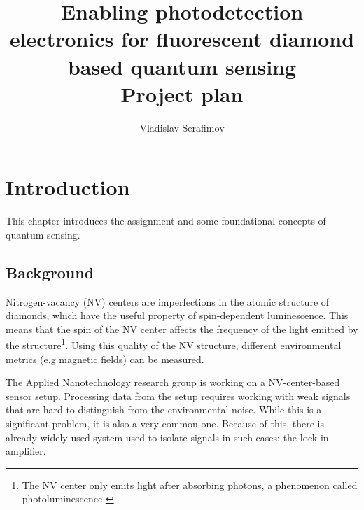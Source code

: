 \documentclass{report}
\title{Enabling photodetection electronics for 
	fluorescent diamond based quantum sensing \\Project plan}
\author{Vladislav Serafimov}
\begin{document}
	\maketitle
	
	\tableofcontents
	
	\chapter{Introduction}
	This chapter introduces the assignment and some foundational concepts of quantum sensing.
	
	\section{Background}
	Nitrogen-vacancy (NV) centers \cite{enwiki:1301369588} are imperfections in the atomic structure of diamonds, which have the useful property of spin-dependent luminescence. This means that the spin of the NV center affects the frequency of the light emitted by the structure\footnote{The NV center only emits light after absorbing photons, a phenomenon called photoluminescence \cite{enwiki:1309081879}}. Using this quality of the NV structure, different environmental metrics (e.g magnetic fields) can be measured. 
	
	The Applied Nanotechnology research group is working on a NV-center-based sensor setup. Processing data from the setup requires working with weak signals that are hard to distinguish from the environmental noise. While this is a significant problem, it is also a very common one. Because of this, there is already widely-used system used to isolate signals in such cases: the lock-in amplifier.
	
	
	
\end{document}
